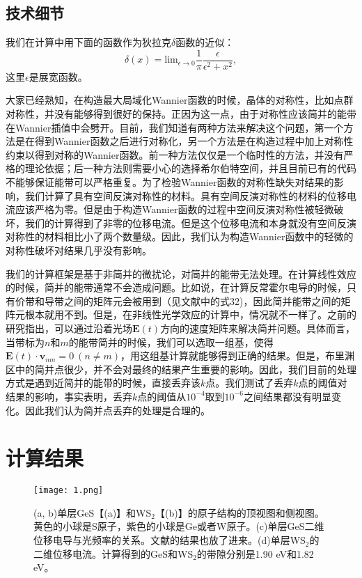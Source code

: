 \subsection{技术细节}

我们在计算中用下面的函数作为狄拉克$\delta$函数的近似：
\[
\delta(x) = \text{lim}_{\epsilon\to0}\frac{1}{\pi}\frac{\epsilon}{\epsilon^{2}+x^{2}},
\]
这里$\epsilon$是展宽函数。

大家已经熟知，在构造最大局域化Wannier函数的时候，晶体的对称性，比如点群对称性，并没有能够得到很好的保持。正因为这一点，由于对称性应该简并的能带在Wannier插值中会劈开。目前，我们知道有两种方法来解决这个问题，第一个方法是在得到Wannier函数之后进行对称化，另一个方法是在构造过程中加上对称性约束以得到对称的Wannier函数。前一种方法仅仅是一个临时性的方法，并没有严格的理论依据；后一种方法则需要小心的选择希尔伯特空间，并且目前已有的代码不能够保证能带可以严格重复。为了检验Wannier函数的对称性缺失对结果的影响，我们计算了具有空间反演对称性的材料。具有空间反演对称性的材料的位移电流应该严格为零。但是由于构造Wannier函数的过程中空间反演对称性被轻微破坏，我们的计算得到了非零的位移电流。但是这个位移电流和本身就没有空间反演对称性的材料相比小了两个数量级。因此，我们认为构造Wannier函数中的轻微的对称性破坏对结果几乎没有影响。

我们的计算框架是基于非简并的微扰论，对简并的能带无法处理。在计算线性效应的时候，简并的能带通常不会造成问题。比如说，在计算反常霍尔电导的时候，只有价带和导带之间的矩阵元会被用到（见文献中的式32)，因此简并能带之间的矩阵元根本就用不到。但是，在非线性光学效应的计算中，情况就不一样了。之前的研究指出，可以通过沿着光场$\mathbf{E}(t)$方向的速度矩阵来解决简并问题。具体而言，当带标为$n$和$m$的能带简并的时候，我们可以选取一组基，使得$\mathbf{E}(t)\cdot\mathbf{v}_{nm}=0  \ (n\ne m)$\cite{sipe_second-order_2000}，用这组基计算就能够得到正确的结果。但是，布里渊区中的简并点很少，并不会对最终的结果产生重要的影响。因此，我们目前的处理方式是遇到近简并的能带的时候，直接丢弃该$k$点。我们测试了丢弃$k$点的阈值对结果的影响，事实表明，丢弃$k$点的阈值从$10^{-4}$取到$10^{-6}$之间结果都没有明显变化。因此我们认为简并点丢弃的处理是合理的。

\section{计算结果}


\begin{figure}
	\begin{centering}
	\texttt{[image: 1.png]}
	\par\end{centering}
	\caption{\label{fig1} (a, b)单层GeS【(a)】和WS$_{2}$【(b)】的原子结构的顶视图和侧视图。黄色的小球是S原子，紫色的小球是Ge或者W原子。(c)单层GeS二维位移电导与光频率的关系。文献的结果也放了进来。(d)单层WS$_2$的二维位移电流。计算得到的GeS和WS$_2$的带隙分别是1.90 eV和1.82 eV。}
\end{figure}

